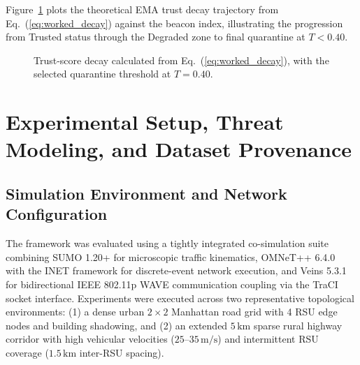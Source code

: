 \documentclass[conference]{IEEEtran}
\begin{document}
Figure~\ref{fig:trust_threshold_trajectory} plots the theoretical EMA trust decay trajectory from Eq.~(\ref{eq:worked_decay}) against the beacon index, illustrating the progression from Trusted status through the Degraded zone to final quarantine at $T < 0.40$.

\begin{figure}[htbp]
\centering
{}
\caption{Trust-score decay calculated from Eq.~(\ref{eq:worked_decay}), with the selected quarantine threshold at $T=0.40$.}
\label{fig:trust_threshold_trajectory}
\end{figure}


\section{Experimental Setup, Threat Modeling, and Dataset Provenance}

\subsection{Simulation Environment and Network Configuration}

The framework was evaluated using a tightly integrated co-simulation suite combining SUMO 1.20+ for microscopic traffic kinematics, OMNeT++ 6.4.0~\cite{omnetpp} with the INET framework for discrete-event network execution, and Veins 5.3.1~\cite{veins} for bidirectional IEEE 802.11p WAVE communication coupling via the TraCI socket interface. Experiments were executed across two representative topological environments: (1) a dense urban $2 \times 2$ Manhattan road grid with 4 RSU edge nodes and building shadowing, and (2) an extended $5\,\text{km}$ sparse rural highway corridor with high vehicular velocities ($25\text{--}35\,\text{m/s}$) and intermittent RSU coverage ($1.5\,\text{km}$ inter-RSU spacing). 
\end{document}
